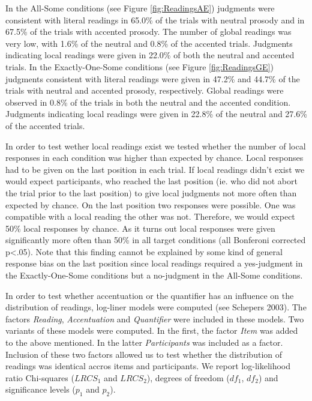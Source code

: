 \documentclass[a4paper,10pt]{article}
\begin{document}
In the All-Some conditions  (see Figure \ref{fig:ReadingsAE}) judgments were consistent with literal readings in 65.0\% of the trials with neutral prosody and in 67.5\% of the trials with accented prosody. The number of global readings was very low, with 1.6\% of the neutral and 0.8\% of the accented trials. Judgments indicating local readings were given in 22.0\% of both the neutral and accented trials. In the Exactly-One-Some conditions (see Figure \ref{fig:ReadingsGE}) judgments consistent with literal readings were given in 47.2\% and 44.7\% of the trials with neutral and accented prosody, respectively. Global readings were observed in 0.8\% of the trials in both the neutral and the accented condition. Judgments indicating local readings were given in 22.8\% of the neutral and 27.6\% of the accented trials.

In order to test wether local readings exist we tested whether the number of local responses in each condition was higher than expected by chance. Local responses had to be given on the last position in each trial. If local readings didn't exist we would expect participants, who reached the last position (ie. who did not abort the trial prior to the last position) to give local judgments not more often than expected by chance. On the last position two responses were possible. One was compatible with a local reading the other was not. Therefore, we would expect 50\% local responses by chance. As it turns out  local responses were given significantly more often than 50\% in all target conditions (all Bonferoni corrected p<.05). Note that this finding cannot be explained by some kind of general response bias on the last position since local readings required a yes-judgment in the Exactly-One-Some conditions but a no-judgment in the All-Some conditions.

In order to test whether accentuation or the quantifier has an influence on the distribution of readings, log-liner models were computed (see Schepers 2003). The factors {\it Reading}, {\it Accentuation} and {\it Quantifier} were included in these models. Two variants of these models were computed.  In the first, the factor {\it Item} was added to the above mentioned. In the latter {\it Participants} was included as a factor. Inclusion of these two factors allowed us to test whether the distribution of readings was identical accros items and participants. We report log-likelihood ratio Chi-squares ($LRCS_1$ and $LRCS_2$), degrees of freedom ($df_1$, $df_2$) and significance levels ($p_1$ and $p_2$).
\end{document}
